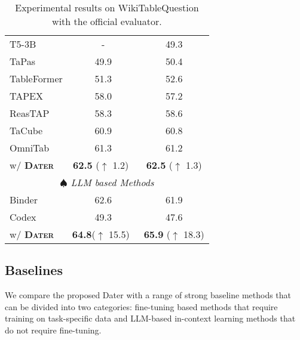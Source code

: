 \begin{table}
\begin{minipage}[t]{0.5\linewidth}
\begin{tabular}{lcc}
    T5-3B  & - & 49.3 \\
    TaPas  & 49.9 & 50.4 \\
    TableFormer & 51.3 & 52.6 \\
    TAPEX  & 58.0 & 57.2 \\
    ReasTAP & 58.3 & 58.6\\
    TaCube  & 60.9 & 60.8 \\
    OmniTab &  61.3 & 61.2 \\
    \rowcolor[RGB]{237,237,237} \quad w/ \textbf{\textsc{Dater}} & \textbf{62.5} ($\uparrow$ 1.2)\ & \textbf{62.5} ($\uparrow$ 1.3)\\
    \midrule
        \multicolumn{3}{c}{\textit{ $\spadesuit$ LLM based Methods}} \\
    Binder & 62.6 & 61.9 \\
    Codex  & 49.3 & 47.6 \\
    \rowcolor[RGB]{237,237,237} \quad w/ \textbf{\textsc{Dater}} & \textbf{64.8}($\uparrow$ 15.5)\  & \textbf{65.9} ($\uparrow$ 18.3) \\
    \bottomrule
  \end{tabular}
  \vspace{0.2cm}
  \caption{
  Experimental results on WikiTableQuestion with the official evaluator. 
  }
  \label{tab:wikitq}
\end{minipage}
\end{table}

\subsection{Baselines}
We compare the proposed Dater with a range of strong baseline methods that can be divided into two categories: fine-tuning based methods that require training on task-specific data and LLM-based in-context learning methods that do not require fine-tuning.

